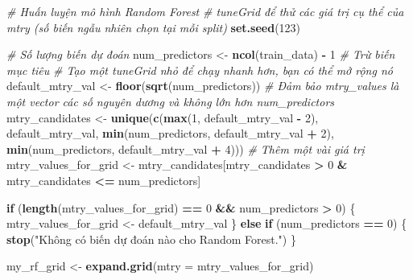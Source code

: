 \documentclass[
]{article}
\newenvironment{Shaded}{\begin{snugshade}}{\end{snugshade}}
\newcommand{\AttributeTok}[1]{\textcolor[rgb]{0.13,0.29,0.53}{#1}}
\newcommand{\CommentTok}[1]{\textcolor[rgb]{0.56,0.35,0.01}{\textit{#1}}}
\newcommand{\ControlFlowTok}[1]{\textcolor[rgb]{0.13,0.29,0.53}{\textbf{#1}}}
\newcommand{\DecValTok}[1]{\textcolor[rgb]{0.00,0.00,0.81}{#1}}
\newcommand{\FunctionTok}[1]{\textcolor[rgb]{0.13,0.29,0.53}{\textbf{#1}}}
\newcommand{\NormalTok}[1]{#1}
\newcommand{\OtherTok}[1]{\textcolor[rgb]{0.56,0.35,0.01}{#1}}
\newcommand{\SpecialCharTok}[1]{\textcolor[rgb]{0.81,0.36,0.00}{\textbf{#1}}}
\newcommand{\StringTok}[1]{\textcolor[rgb]{0.31,0.60,0.02}{#1}}
\begin{document}
\begin{Shaded}
\begin{Highlighting}[]
\CommentTok{\# Huấn luyện mô hình Random Forest}
\CommentTok{\# \textasciigrave{}tuneGrid\textasciigrave{} để thử các giá trị cụ thể của mtry (số biến ngẫu nhiên chọn tại mỗi split)}
\FunctionTok{set.seed}\NormalTok{(}\DecValTok{123}\NormalTok{)}

\CommentTok{\# Số lượng biến dự đoán}
\NormalTok{num\_predictors }\OtherTok{\textless{}{-}} \FunctionTok{ncol}\NormalTok{(train\_data) }\SpecialCharTok{{-}} \DecValTok{1} \CommentTok{\# Trừ biến mục tiêu}
\CommentTok{\# Tạo một tuneGrid nhỏ để chạy nhanh hơn, bạn có thể mở rộng nó}
\NormalTok{default\_mtry\_val }\OtherTok{\textless{}{-}} \FunctionTok{floor}\NormalTok{(}\FunctionTok{sqrt}\NormalTok{(num\_predictors))}
\CommentTok{\# Đảm bảo mtry\_values là một vector các số nguyên dương và không lớn hơn num\_predictors}
\NormalTok{mtry\_candidates }\OtherTok{\textless{}{-}} \FunctionTok{unique}\NormalTok{(}\FunctionTok{c}\NormalTok{(}\FunctionTok{max}\NormalTok{(}\DecValTok{1}\NormalTok{, default\_mtry\_val }\SpecialCharTok{{-}} \DecValTok{2}\NormalTok{), }
\NormalTok{                            default\_mtry\_val, }
                            \FunctionTok{min}\NormalTok{(num\_predictors, default\_mtry\_val }\SpecialCharTok{+} \DecValTok{2}\NormalTok{),}
                            \FunctionTok{min}\NormalTok{(num\_predictors, default\_mtry\_val }\SpecialCharTok{+} \DecValTok{4}\NormalTok{))) }\CommentTok{\# Thêm một vài giá trị}
\NormalTok{mtry\_values\_for\_grid }\OtherTok{\textless{}{-}}\NormalTok{ mtry\_candidates[mtry\_candidates }\SpecialCharTok{\textgreater{}} \DecValTok{0} \SpecialCharTok{\&}\NormalTok{ mtry\_candidates }\SpecialCharTok{\textless{}=}\NormalTok{ num\_predictors]}

\ControlFlowTok{if}\NormalTok{ (}\FunctionTok{length}\NormalTok{(mtry\_values\_for\_grid) }\SpecialCharTok{==} \DecValTok{0} \SpecialCharTok{\&\&}\NormalTok{ num\_predictors }\SpecialCharTok{\textgreater{}} \DecValTok{0}\NormalTok{) \{}
\NormalTok{    mtry\_values\_for\_grid }\OtherTok{\textless{}{-}}\NormalTok{ default\_mtry\_val }
\NormalTok{\} }\ControlFlowTok{else} \ControlFlowTok{if}\NormalTok{ (num\_predictors }\SpecialCharTok{==} \DecValTok{0}\NormalTok{) \{}
    \FunctionTok{stop}\NormalTok{(}\StringTok{"Không có biến dự đoán nào cho Random Forest."}\NormalTok{)}
\NormalTok{\}}

\NormalTok{my\_rf\_grid }\OtherTok{\textless{}{-}} \FunctionTok{expand.grid}\NormalTok{(}\AttributeTok{mtry =}\NormalTok{ mtry\_values\_for\_grid)}


\end{Highlighting}
\end{Shaded}
\end{document}
